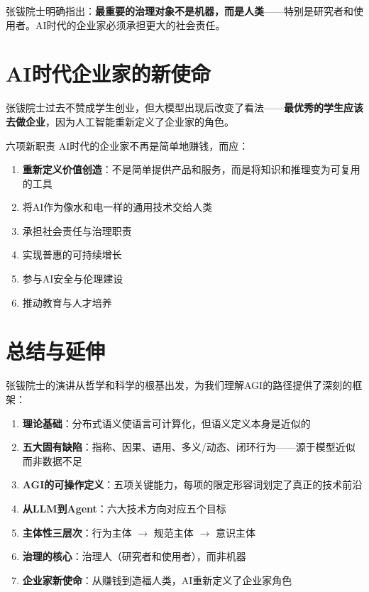 \documentclass[a4paper]{article}
\begin{document}
张钹院士明确指出：\textbf{最重要的治理对象不是机器，而是人类}——特别是研究者和使用者。AI时代的企业家必须承担更大的社会责任。


\section{AI时代企业家的新使命}

张钹院士过去不赞成学生创业，但大模型出现后改变了看法——\textbf{最优秀的学生应该去做企业}，因为人工智能重新定义了企业家的角色。

\begin{importantbox}{六项新职责}
AI时代的企业家不再是简单地赚钱，而应：
\begin{enumerate}
\item \textbf{重新定义价值创造}：不是简单提供产品和服务，而是将知识和推理变为可复用的工具
\item 将AI作为像水和电一样的通用技术交给人类
\item 承担社会责任与治理职责
\item 实现普惠的可持续增长
\item 参与AI安全与伦理建设
\item 推动教育与人才培养
\end{enumerate}
\end{importantbox}


\section{总结与延伸}

张钹院士的演讲从哲学和科学的根基出发，为我们理解AGI的路径提供了深刻的框架：

\begin{enumerate}
\item \textbf{理论基础}：分布式语义使语言可计算化，但语义定义本身是近似的
\item \textbf{五大固有缺陷}：指称、因果、语用、多义/动态、闭环行为——源于模型近似而非数据不足
\item \textbf{AGI的可操作定义}：五项关键能力，每项的限定形容词划定了真正的技术前沿
\item \textbf{从LLM到Agent}：六大技术方向对应五个目标
\item \textbf{主体性三层次}：行为主体 $\rightarrow$ 规范主体 $\rightarrow$ 意识主体
\item \textbf{治理的核心}：治理人（研究者和使用者），而非机器
\item \textbf{企业家新使命}：从赚钱到造福人类，AI重新定义了企业家角色
\end{enumerate}
\end{document}
